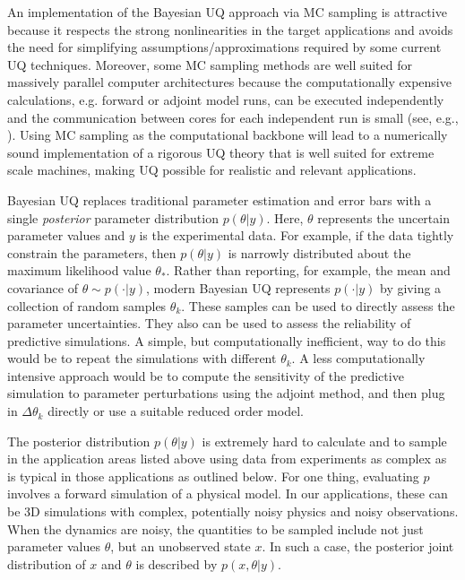 \documentclass[11pt]{article}
\newcommand{\MarginPar}[1]{\marginpar{%
\vskip-\baselineskip %
\raggedright\tiny\sffamily
\hrule\smallskip{\color{red}#1}\par\smallskip\hrule}}
\begin{document}
An implementation of the Bayesian UQ approach via MC sampling
is attractive because it respects the strong nonlinearities in the target applications
and avoids the need for simplifying assumptions/approximations required by some current UQ techniques.
Moreover, some MC sampling methods are well suited for massively parallel computer
architectures because the computationally expensive calculations,
e.g. forward or adjoint model runs, can be executed independently and
the communication between cores for each independent run is small (see, e.g., \cite{Foreman-Mackey}).
Using MC sampling as the computational backbone will lead to a numerically sound
implementation of a rigorous UQ theory that is well suited for extreme
scale machines, making UQ possible for realistic and relevant applications.

Bayesian UQ replaces traditional parameter estimation and error bars with a single {\em posterior}
parameter distribution $p(\theta|y)$. 
Here, $\theta$ represents the uncertain parameter values and $y$ is the experimental data.
For example, if the data tightly constrain the parameters, then $p(\theta|y)$ is narrowly 
distributed about the maximum likelihood value $\theta_*$.
Rather than reporting, for example, the mean and covariance of $\theta \sim p(\cdot|y)$,
modern Bayesian UQ represents $p(\cdot|y)$ by giving a collection of random samples $\theta_k$.
These samples can be used to directly assess the parameter uncertainties.
They also can be used to assess the reliability of predictive simulations.
A simple, but computationally inefficient,  way to do this would be to repeat the simulations with different $\theta_k$.
A less computationally intensive approach would be to compute the sensitivity of the predictive 
simulation to parameter perturbations using the adjoint method, and then plug in $\Delta \theta_k$
directly or use a suitable reduced order model.

The posterior distribution $p(\theta|y)$ is extremely hard to calculate and to sample in the 
application areas listed above using data from experiments as complex
as is typical in those applications as outlined below.
For one thing, evaluating $p$ involves a forward simulation of a physical model.
In our applications, these can be 3D simulations with complex, potentially noisy physics and noisy observations.
When the dynamics are noisy, the quantities to be sampled include not just parameter values $\theta$,
but an unobserved state $x$.
In such a case, the posterior joint distribution of $x$ and $\theta$ is described by $p(x,\theta|y)$.
\end{document}
